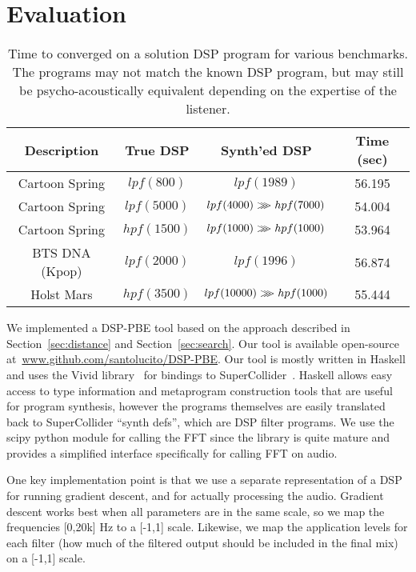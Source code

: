 \section{Evaluation}
\label{sec:eval}
\begin{table*}[!ht]
\centering
\setlength\tabcolsep{2em}
\begin{tabular}{|c | c | c | c |} 
 \hline
 Description & True DSP & Synth'ed DSP & Time (sec) \\ 
 \hline\hline
 Cartoon Spring & $lpf(800)  $ & $lpf(1989) $ & 56.195 \\
 Cartoon Spring & $lpf(5000) $ & $lpf(4000) >\mkern-9mu>\mkern-9mu> hpf(7000) $ & 54.004 \\
 Cartoon Spring & $hpf(1500) $ & $lpf(1000) >\mkern-9mu>\mkern-9mu> hpf(1000) $ & 53.964 \\
 BTS DNA (Kpop) & $lpf(2000) $ & $lpf(1996)	 $ & 56.874 \\
 Holst Mars     & $hpf(3500) $ & $lpf(10000) >\mkern-9mu>\mkern-9mu> hpf(1000)$  & 55.444 \\
 \hline
\end{tabular}
\caption{Time to converged on a solution DSP program for various benchmarks. The programs may not match the known DSP program, but may still be psycho-acoustically equivalent depending on the expertise of the listener. }
\label{table:eval}
\end{table*}

We implemented a DSP-PBE tool based on the approach described in Section~\ref{sec:distance} and Section~\ref{sec:search}.
Our tool is available open-source at~\url{www.github.com/santolucito/DSP-PBE}.
Our tool is mostly written in Haskell and uses the Vivid library~\cite{vivid} for bindings to SuperCollider~\cite{supercollider}.
Haskell allows easy access to type information and metaprogram construction tools that are useful for program synthesis, however the programs themselves are easily translated back to SuperCollider ``synth defs'', which are DSP filter programs.
We use the scipy python module for calling the FFT since the library is quite mature and provides a simplified interface specifically for calling FFT on audio.

One key implementation point is that we use a separate representation of a DSP for running gradient descent, and for actually processing the audio.
Gradient descent works best when all parameters are in the same scale, so we map the frequencies [0,20k] Hz to a [-1,1] scale.
Likewise, we map the application levels for each filter (how much of the filtered output should be included in the final mix) on a [-1,1] scale.

